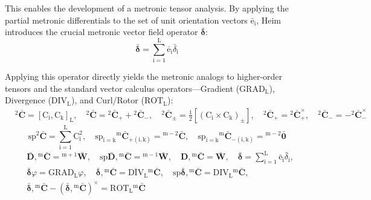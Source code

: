 \documentclass[12pt]{article}
\begin{document}
This enables the development of a metronic tensor analysis. By applying the partial metronic differentials to the set of unit orientation vectors $\bar{\mathrm{e}}_\mathrm{i}$, Heim introduces the crucial metronic vector field operator $\bar{\bm{\delta}}$:
\begin{equation*}
\bar{\bm{\delta}} = \sum_{\mathrm{i}=1}^\mathrm{L} \bar{\mathrm{e}}_\mathrm{i} \bar{\delta}_\mathrm{i}
\end{equation*}

Applying this operator directly yields the metronic analogs to higher-order tensors and the standard vector calculus operators—Gradient ($\mathrm{GRAD}_\mathrm{L}$), Divergence ($\mathrm{DIV}_\mathrm{L}$), and Curl/Rotor ($\mathrm{ROT}_\mathrm{L}$):
\begin{equation}
\begin{aligned}
& {}^2\bar{\mathbf{C}} = \left[ \mathrm{C_i}, \mathrm{C_k} \right]_\mathrm{L}, \quad {}^2\bar{\mathbf{C}} = {}^2\bar{\mathbf{C}}_+ + {}^2\bar{\mathbf{C}}_-, \quad {}^2\bar{\mathbf{C}}_\pm = \frac{1}{2} \left[ (\mathrm{C_i} \times \mathrm{C_k})_\pm \right], \quad {}^2\bar{\mathbf{C}}_+ = {}^2\bar{\mathbf{C}}_+^\times, \quad {}^2\bar{\mathbf{C}}_- = -{}^2\bar{\mathbf{C}}_-^\times
\end{aligned} \tag{79}
\end{equation}
\begin{equation}
\mathrm{sp} {}^2\bar{\mathbf{C}} = \sum_{\mathrm{i}=1}^\mathrm{L} \mathrm{C}_\mathrm{i}^2, \quad \mathrm{sp}_{\mathrm{i=k}} {}^\mathrm{m}\bar{\mathbf{C}}_{+(\mathrm{i,k})} = {}^{\mathrm{m}-2}\bar{\mathbf{C}}, \quad \mathrm{sp}_{\mathrm{i=k}} {}^\mathrm{m}\bar{\mathbf{C}}_{-(\mathrm{i,k})} = {}^{\mathrm{m}-2}\bar{\mathbf{0}} \tag{79a}
\end{equation}
\begin{equation}
\begin{aligned}
& \bar{\mathbf{D}}, {}^\mathrm{m}\bar{\mathbf{C}} = {}^{\mathrm{m+1}}\bar{\mathbf{W}}, \quad \mathrm{sp} \bar{\mathbf{D}}, {}^\mathrm{m}\bar{\mathbf{C}} = {}^{\mathrm{m-1}}\bar{\mathbf{W}}, \quad \mathbf{D}, {}^\mathrm{m}\bar{\mathbf{C}} = \bar{\mathbf{W}}, \quad \bar{\bm{\delta}} = \sum_{\mathrm{i}=1}^\mathrm{L} \bar{\mathrm{e}}_\mathrm{i} \bar{\delta}_\mathrm{i}, \\
& \bar{\bm{\delta}}\varphi = \mathrm{GRAD}_\mathrm{L} \varphi, \quad \bar{\bm{\delta}}, {}^\mathrm{m}\bar{\mathbf{C}} = \overline{\mathrm{DIV}}_\mathrm{L} {}^\mathrm{m}\bar{\mathbf{C}}, \quad \mathrm{sp} \bar{\bm{\delta}}, {}^\mathrm{m}\bar{\mathbf{C}} = \mathrm{DIV}_\mathrm{L} {}^\mathrm{m}\bar{\mathbf{C}}, \\
& \bar{\bm{\delta}}, {}^\mathrm{m}\bar{\mathbf{C}} - \left( \bar{\bm{\delta}}, {}^\mathrm{m}\bar{\mathbf{C}} \right)^\times = \mathrm{ROT}_\mathrm{L} {}^\mathrm{m}\bar{\mathbf{C}}
\end{aligned} \tag{79b}
\label{eq:original_metronic_grad_div_rot}
\end{equation}
\end{document}
